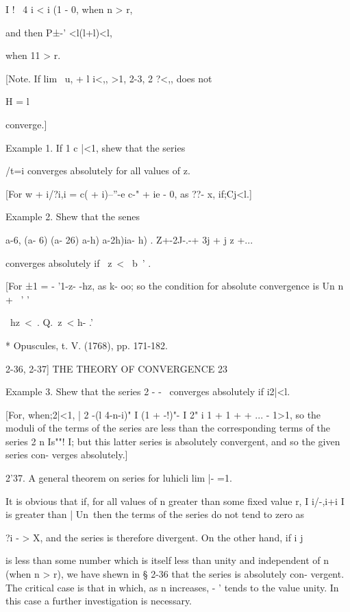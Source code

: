 I ! \ 4 i < i (1 - 0, when n > r,



and then P±-' <l(l+l)<l,

when 11 > r.

[Note. If lim \ u, + l i<,, >1, %
2-3, 2 ?<,, does not

H = l

converge.]

Example 1. If 1 c |<1, shew that the series

/t=i converges absolutely for all values of z.

[For w + i/?i,i = c( + i)--''-e c-" + ie - 0, as ??- x, if;Cj<l.]

Example 2. Shew that the senes



a-6, (a- 6) (a- 26) a-h) a-2h)ia- h) . Z+-2J-.-+ 3j + j z +...

converges absolutely if \ z\ < \ b~' .



[For ±1 = - '1-z- -hz, as k- oo; so the condition for absolute
convergence is Un n + \ ' '

\ hz\ < \,. Q.\ z\ < h- .'\

* Opuscules, t. V. (1768), pp. 171-182.



2-36, 2-37] THE THEORY OF CONVERGENCE 23

Example 3. Shew that the series 2 - - \, converges absolutely if
i2|<l.

[For, when;2|<1, | 2 -(l 4-n-i)" I (1 + -!)"- I 2" i 1 + 1 + + ... -
1>1, so the moduli of the terms of the series are less than the
corresponding terms of the series 2 n Is""! I; but this latter series
is absolutely convergent, and so the given series con- verges
absolutely.]

2'37. A general theorem on series for luhicli lim |- =1.

It is obvious that if, for all values of n greater than some fixed
value r, I i/-,i+i I is greater than | Un\, then the terms of the
series do not tend to zero as

?i - > X, and the series is therefore divergent. On the other hand,
if i j

is less than some number which is itself less than unity and
independent of n (when n > r), we have shewn in § 2-36 that the series
is absolutely con- vergent. The critical case is that in which, as n
increases, - ' tends to the value unity. In this case a further
investigation is necessary.

